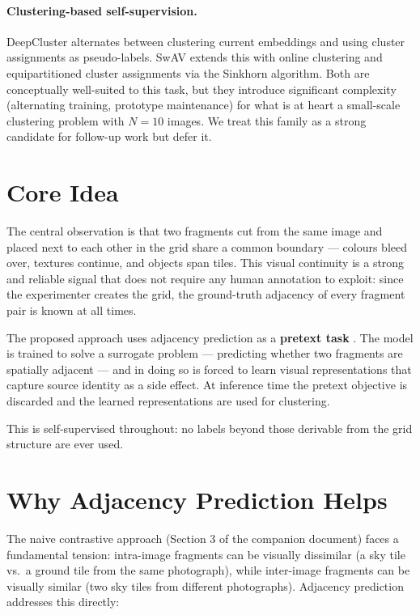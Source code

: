 \documentclass[12pt, a4paper]{article}
\begin{document}
\paragraph{Clustering-based self-supervision.}
DeepCluster \parencite{deepcluster2018} alternates between clustering current
embeddings and using cluster assignments as pseudo-labels. SwAV
\parencite{swav2020} extends this with online clustering and equipartitioned cluster
assignments via the Sinkhorn algorithm. Both are conceptually well-suited to this
task, but they introduce significant complexity (alternating training, prototype
maintenance) for what is at heart a small-scale clustering problem with $N = 10$
images. We treat this family as a strong candidate for follow-up work but defer it.

\section{Core Idea}

The central observation is that two fragments cut from the same image and placed next to
each other in the grid share a common boundary — colours bleed over, textures continue,
and objects span tiles. This visual continuity is a strong and reliable signal that does
not require any human annotation to exploit: since the experimenter creates the grid, the
ground-truth adjacency of every fragment pair is known at all times.

The proposed approach uses adjacency prediction as a \textbf{pretext task}
\parencite{noroozi2016}. The model is trained to solve a surrogate problem — predicting
whether two fragments are spatially adjacent — and in doing so is forced to learn visual
representations that capture source identity as a side effect. At inference time the
pretext objective is discarded and the learned representations are used for clustering.

This is self-supervised throughout: no labels beyond those derivable from the grid
structure are ever used.

\section{Why Adjacency Prediction Helps}

The naive contrastive approach (Section 3 of the companion document) faces a fundamental
tension: intra-image fragments can be visually dissimilar (a sky tile vs.\ a ground tile
from the same photograph), while inter-image fragments can be visually similar (two sky
tiles from different photographs). Adjacency prediction addresses this directly:
\end{document}
